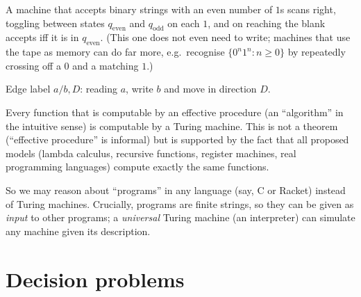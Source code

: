 \begin{example}
A machine that accepts binary strings with an even number of $1$s scans right, toggling
between states $q_{\mathrm{even}}$ and $q_{\mathrm{odd}}$ on each $1$, and on reaching
the blank accepts iff it is in $q_{\mathrm{even}}$. (This one does not even need to write;
machines that use the tape as memory can do far more, e.g.\ recognise
$\{0^n1^n : n\ge0\}$ by repeatedly crossing off a $0$ and a matching $1$.)
\end{example}
\begin{center}

\small Edge label $a/b,D$: reading $a$, write $b$ and move in direction $D$.
\end{center}

\begin{important}
Every function that is computable by an effective procedure (an ``algorithm'' in the
intuitive sense) is computable by a Turing machine. This is not a theorem (``effective
procedure'' is informal) but is supported by the fact that all proposed models (lambda
calculus, recursive functions, register machines, real programming languages) compute
exactly the same functions.
\end{important}

So we may reason about ``programs'' in any language (say, C or Racket) instead of Turing
machines. Crucially, programs are finite strings, so they can be given as \emph{input} to
other programs; a \emph{universal} Turing machine (an interpreter) can simulate any machine
given its description.

\section{Decision problems}

